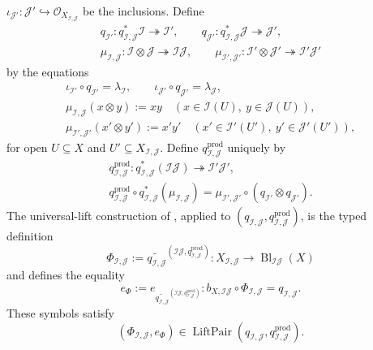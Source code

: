 \begin{definition}
  $\iota_{\mathcal J'}\colon\mathcal J'\hookrightarrow
  \mathcal O_{X_{\mathcal I,\mathcal J}}$ be the inclusions.  Define
  \[
  \begin{gathered}
    q_{\mathcal I'}\colon
      q_{\mathcal I,\mathcal J}^*\mathcal I\twoheadrightarrow\mathcal I',
    \qquad
    q_{\mathcal J'}\colon
      q_{\mathcal I,\mathcal J}^*\mathcal J\twoheadrightarrow\mathcal J',\\
    \mu_{\mathcal I,\mathcal J}\colon
      \mathcal I\otimes\mathcal J\twoheadrightarrow\mathcal I\mathcal J,
    \qquad
    \mu_{\mathcal I',\mathcal J'}\colon
      \mathcal I'\otimes\mathcal J'\twoheadrightarrow\mathcal I'\mathcal J'
  \end{gathered}
  \]
  by the equations
  \[
  \begin{gathered}
    \iota_{\mathcal I'}\circ q_{\mathcal I'}=\lambda_{\mathcal I},
    \qquad
    \iota_{\mathcal J'}\circ q_{\mathcal J'}=\lambda_{\mathcal J},\\
    \mu_{\mathcal I,\mathcal J}(x\otimes y):=xy
      \quad(x\in\mathcal I(U),\ y\in\mathcal J(U)),\\
    \mu_{\mathcal I',\mathcal J'}(x'\otimes y'):=x'y'
      \quad(x'\in\mathcal I'(U'),\ y'\in\mathcal J'(U')),
  \end{gathered}                                               \tag{PCb}
  \]
  for open $U\subseteq X$ and
  $U'\subseteq X_{\mathcal I,\mathcal J}$.
  Define
  $q^{\mathrm{prod}}_{\mathcal I,\mathcal J}$ uniquely by
  \[
  \begin{gathered}
    q^{\mathrm{prod}}_{\mathcal I,\mathcal J}\colon
      q_{\mathcal I,\mathcal J}^*(\mathcal I\mathcal J)
        \twoheadrightarrow\mathcal I'\mathcal J',\\
    q^{\mathrm{prod}}_{\mathcal I,\mathcal J}\circ
      q_{\mathcal I,\mathcal J}^*(\mu_{\mathcal I,\mathcal J})
      =\mu_{\mathcal I',\mathcal J'}\circ
        (q_{\mathcal I'}\otimes q_{\mathcal J'}).
  \end{gathered}
  \]
  The universal-lift construction of
  , applied to
  $(q_{\mathcal I,\mathcal J},q^{\mathrm{prod}}_{\mathcal I,\mathcal J})$,
  is the typed definition
  \[
    \Phi_{\mathcal I,\mathcal J}
      :=\widetilde{q_{\mathcal I,\mathcal J}}^{
        (\mathcal I\mathcal J,q^{\mathrm{prod}}_{\mathcal I,\mathcal J})}
        \colon
      X_{\mathcal I,\mathcal J}
      \longrightarrow\operatorname{Bl}_{\mathcal I\mathcal J}(X)
  \]
  and  defines the equality
  \[
    e_\Phi:=e_{\widetilde{q_{\mathcal I,\mathcal J}}^{
      (\mathcal I\mathcal J,q^{\mathrm{prod}}_{\mathcal I,\mathcal J})}}
      \colon
      b_{X,\mathcal I\mathcal J}\circ\Phi_{\mathcal I,\mathcal J}
        =q_{\mathcal I,\mathcal J}.
  \]
  These symbols satisfy
  \[
    (\Phi_{\mathcal I,\mathcal J},e_{\Phi})
      \in\operatorname{LiftPair}
        (q_{\mathcal I,\mathcal J},
          q^{\mathrm{prod}}_{\mathcal I,\mathcal J}).
  \]


\end{definition}
